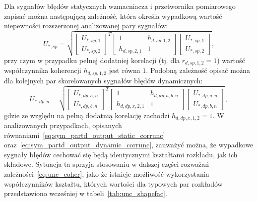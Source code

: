 Dla sygnałów błędów statycznych wzmacniacza i przetwornika pomiarowego zapisać można następującą zależność, która określa wypadkową wartość niepewności rozszerzonej analizowanej pary sygnałów:
\begin{equation}
U_{*,sp} = \sqrt{
\begin{bmatrix}
U_{*,sp,1} \\ U_{*,sp,2}
\end{bmatrix}^{T}
\begin{bmatrix}
1 & h_{d,sp,1,2} \\
h_{d,sp,2,1} & 1
\end{bmatrix}
\begin{bmatrix}
U_{*,sp,1} \\ U_{*,sp,2}
\end{bmatrix}}
\label{eq:sym_partd_output_static_corrunc},
\end{equation}
przy czym w przypadku pełnej dodatniej korelacji (tj. dla $r_{d,sp,1,2} = 1$) wartość współczynnika koherencji $h_{d,sp,1,2}$ jest równa $1$. Podobną zależność opisać można dla kolejnych par skorelowanych sygnałów błędów dynamicznych:
\begin{equation}
U_{*,dp,n} = \sqrt{
\begin{bmatrix}
U_{*,dp,a,n} \\ U_{*,dp,b,n}
\end{bmatrix}^{T}
\begin{bmatrix}
1 & h_{d,dp,a,b,n} \\
h_{d,dp,x,2,1} & 1
\end{bmatrix}
\begin{bmatrix}
U_{*,dp,a,n} \\ U_{*,dp,b,n}
\end{bmatrix}}
\label{eq:sym_partd_output_dynamic_corrunc},
\end{equation}
gdzie ze względu na pełną dodatnią korelację zachodzi $h_{d,dp,x,1,2} = 1$. W analizowanych przypadkach, opisanych równaniami~\eqref{eq:sym_partd_output_static_corrunc} oraz~\eqref{eq:sym_partd_output_dynamic_corrunc}, zauważyć można, że wypadkowe sygnały błędów cechować się będą identycznymi kształtami rozkładu, jak ich składowe. Sytuacja ta sprzyja stosowaniu w dalszej części rozważań zależności~\eqref{eq:unc_coher}, jako że istnieje możliwość wykorzystania współczynników kształtu, których wartości dla typowych par rozkładów przedstawiono wcześniej w tabeli~\ref{tab:unc_shapefac}.

